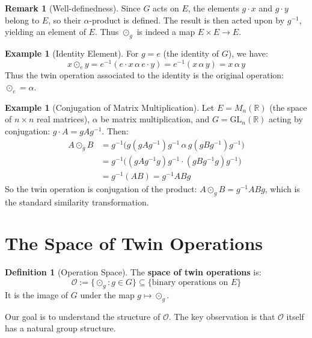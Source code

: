 \documentclass[11pt,a4paper,openany]{book}
\theoremstyle{plain}
\theoremstyle{definition}
\newtheorem{definition}[theorem]{Definition}
\newtheorem{example}[theorem]{Example}
\newtheorem{remark}[theorem]{Remark}
\newcommand{\twing}[1]{\odot_{#1}}
\newcommand{\opspace}{\mathcal{O}}
\newcommand{\actspace}{E}
\newcommand{\groupG}{G}
\newcommand{\RR}{\mathbb{R}}
\newcommand{\GL}{\mathrm{GL}}
\begin{document}
\begin{remark}[Well-definedness]
Since $\groupG$ acts on $\actspace$, the elements $g \cdot x$ and $g \cdot y$ belong to $\actspace$, so their $\alpha$-product is defined. The result is then acted upon by $g^{-1}$, yielding an element of $\actspace$. Thus $\twing{g}$ is indeed a map $\actspace \times \actspace \to \actspace$.
\end{remark}

\begin{example}[Identity Element]\label{ex:identity}
For $g = e$ (the identity of $\groupG$), we have:
\[
x \twing{e} y = e^{-1}(e \cdot x \,\alpha\, e \cdot y) = e^{-1}(x \,\alpha\, y) = x \,\alpha\, y
\]
Thus the twin operation associated to the identity is the original operation: $\twing{e} = \alpha$.
\end{example}

\begin{example}[Conjugation of Matrix Multiplication]\label{ex:matrix-conj}
Let $\actspace = M_n(\RR)$ (the space of $n \times n$ real matrices), $\alpha$ be matrix multiplication, and $\groupG = \GL_n(\RR)$ acting by conjugation: $g \cdot A = gAg^{-1}$. Then:
\begin{align*}
A \twing{g} B &= g^{-1}\big(g(gAg^{-1})g^{-1} \,\alpha\, g(gBg^{-1})g^{-1}\big) \\
&= g^{-1}\big((gAg^{-1}g)g^{-1} \cdot (gBg^{-1}g)g^{-1}\big) \\
&= g^{-1}(AB) = g^{-1}ABg
\end{align*}
So the twin operation is conjugation of the product: $A \twing{g} B = g^{-1}ABg$, which is the standard similarity transformation.
\end{example}

\section{The Space of Twin Operations}

\begin{definition}[Operation Space]\label{def:op-space}\index{$\opspace$|see{operation space}}
The \textbf{space of twin operations} is:
\[
\opspace := \{\twing{g} : g \in \groupG\} \subseteq \{\text{binary operations on } \actspace\}
\]
It is the image of $\groupG$ under the map $g \mapsto \twing{g}$.
\end{definition}

Our goal is to understand the structure of $\opspace$. The key observation is that $\opspace$ itself has a natural group structure.
\end{document}
